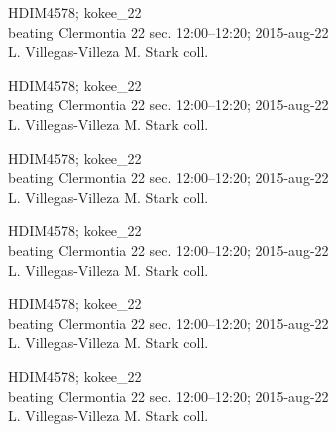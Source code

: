 \documentclass[2pt]{extarticle}
\begin{document}
\noindent
\parbox{0.16\textwidth}{\tiny \raggedright \rule[-0.3\baselineskip]{0pt}{10pt}HDIM4578; kokee\_22\\ beating Clermontia 22 sec. 12:00--12:20; 2015-aug-22\\ L. Villegas-Villeza M. Stark coll.}
\parbox{0.16\textwidth}{\tiny \raggedright \rule[-0.3\baselineskip]{0pt}{10pt}HDIM4578; kokee\_22\\ beating Clermontia 22 sec. 12:00--12:20; 2015-aug-22\\ L. Villegas-Villeza M. Stark coll.}
\parbox{0.16\textwidth}{\tiny \raggedright \rule[-0.3\baselineskip]{0pt}{10pt}HDIM4578; kokee\_22\\ beating Clermontia 22 sec. 12:00--12:20; 2015-aug-22\\ L. Villegas-Villeza M. Stark coll.}
\parbox{0.16\textwidth}{\tiny \raggedright \rule[-0.3\baselineskip]{0pt}{10pt}HDIM4578; kokee\_22\\ beating Clermontia 22 sec. 12:00--12:20; 2015-aug-22\\ L. Villegas-Villeza M. Stark coll.}
\parbox{0.16\textwidth}{\tiny \raggedright \rule[-0.3\baselineskip]{0pt}{10pt}HDIM4578; kokee\_22\\ beating Clermontia 22 sec. 12:00--12:20; 2015-aug-22\\ L. Villegas-Villeza M. Stark coll.}
\parbox{0.16\textwidth}{\tiny \raggedright \rule[-0.3\baselineskip]{0pt}{10pt}HDIM4578; kokee\_22\\ beating Clermontia 22 sec. 12:00--12:20; 2015-aug-22\\ L. Villegas-Villeza M. Stark coll.} \\ 
\vspace{0.001in} 
\end{document}
